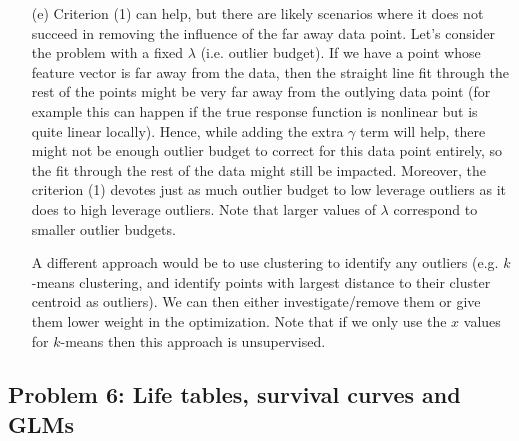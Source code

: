 \begin{itemize}
\item[(e)]  Criterion (1) can help, but there are likely scenarios where it does not succeed in removing the influence of the far away data point. Let's consider the problem with a fixed $\lambda$ (i.e. outlier budget). If we have a point whose feature vector is far away from the data, then the straight line fit through the rest of the points might be very far away from the outlying data point (for example this can happen if the true response function is nonlinear but is quite linear locally). Hence, while adding the extra $\gamma$ term will help, there might not be enough outlier budget to correct for this data point entirely, so the fit through the rest of the data might still be impacted. Moreover, the criterion (1) devotes just as much outlier budget to low leverage outliers as it does to high leverage outliers. Note that larger values of $\lambda$ correspond to smaller outlier budgets.  

A different approach would be to use clustering to identify any outliers (e.g. $k$-means clustering, and identify points with largest distance to their cluster centroid as outliers). We can then either investigate/remove them or give them lower weight in the optimization. Note that if we only use the $x$ values for $k$-means then this approach is unsupervised.
\end{itemize}



\subsection*{Problem 6: Life tables, survival curves and GLMs}


